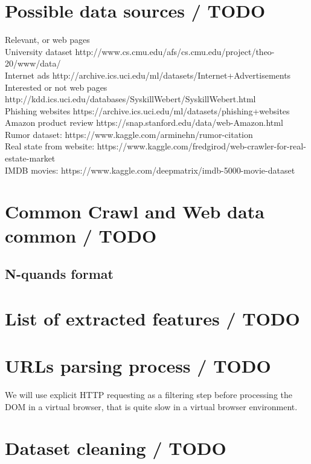 \section{Possible data sources / TODO}

Relevant, or web pages\\
University dataset http://www.cs.cmu.edu/afs/cs.cmu.edu/project/theo-20/www/data/\\
Internet ads http://archive.ics.uci.edu/ml/datasets/Internet+Advertisements\\
Interested or not web pages http://kdd.ics.uci.edu/databases/SyskillWebert/SyskillWebert.html\\
Phishing websites https://archive.ics.uci.edu/ml/datasets/phishing+websites\\
Amazon product review https://snap.stanford.edu/data/web-Amazon.html\\
Rumor dataset: https://www.kaggle.com/arminehn/rumor-citation\\
Real state from website: https://www.kaggle.com/fredgirod/web-crawler-for-real-estate-market\\
IMDB movies: https://www.kaggle.com/deepmatrix/imdb-5000-movie-dataset\\



\label{sec:datasource}
\section{Common Crawl and Web data common / TODO}
\subsection{N-quands format}
\label{subsec:nquand}
\section{List of extracted features / TODO}
\label{sec:features}
\section{URLs parsing process / TODO}
\label{sec:urlparse}
We will use explicit HTTP requesting as a filtering step before processing the DOM in a virtual browser, that is quite slow in a virtual browser environment. \\

\label{sec:urlparse}
\section{Dataset cleaning / TODO}
\label{sec:dataclean}